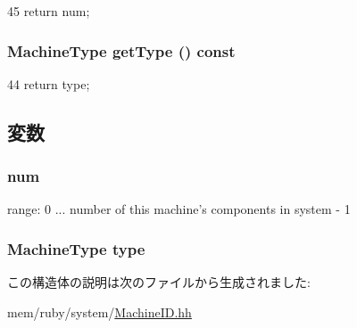 \begin{DoxyCode}
45 { return num; }
\end{DoxyCode}
\hypertarget{structMachineID_a3979ddfd39fd9b22e4bb58bb0ff50726}{
\subsubsection[{getType}]{\setlength{\rightskip}{0pt plus 5cm}MachineType getType () const}}
\label{structMachineID_a3979ddfd39fd9b22e4bb58bb0ff50726}



\begin{DoxyCode}
44 { return type; }
\end{DoxyCode}


\subsection{変数}
\hypertarget{structMachineID_a94f95f94fc2a995609dafb041ae268ad}{
\subsubsection[{num}]{ {\bf num}}}
\label{structMachineID_a94f95f94fc2a995609dafb041ae268ad}


range: 0 ... number of this machine's components in system -\/ 1 \hypertarget{structMachineID_a47a4e8abb3f6f594e1bfdaf611bc62ab}{
\subsubsection[{type}]{\setlength{\rightskip}{0pt plus 5cm}MachineType {\bf type}}}
\label{structMachineID_a47a4e8abb3f6f594e1bfdaf611bc62ab}


この構造体の説明は次のファイルから生成されました:\begin{DoxyCompactItemize}
\item 
mem/ruby/system/\hyperlink{MachineID_8hh}{MachineID.hh}\end{DoxyCompactItemize}
